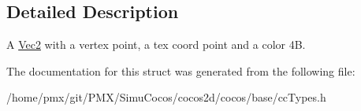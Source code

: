 \subsection{Detailed Description}
A \hyperlink{classVec2}{Vec2} with a vertex point, a tex coord point and a color 4B. 

The documentation for this struct was generated from the following file\+:\begin{DoxyCompactItemize}
\item 
/home/pmx/git/\+P\+M\+X/\+Simu\+Cocos/cocos2d/cocos/base/cc\+Types.\+h\end{DoxyCompactItemize}
